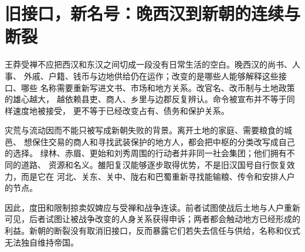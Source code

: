 \section{旧接口，新名号：晚西汉到新朝的连续与断裂}
\label{sec:han-late-western-continuity-breaks}

王莽受禅不应把西汉和东汉之间切成一段没有日常生活的空白。晚西汉的尚书、人事、
外戚、户籍、钱币与边地供给仍在运作；改变的是哪些人能够解释这些接口、哪些
名称需要重新写进文书、市场和地方关系。改官名、改币制与土地政策的雄心越大，
越依赖县吏、商人、乡里与边郡反复辨认。命令被宣布并不等于同样速度地被接受，
更不等于已经改变占有、债务和保护关系。

灾荒与流动因而不能只被写成新朝失败的背景。离开土地的家庭、需要粮食的城邑、
想保住交易的商人和寻找武装保护的地方人，都会把中枢的分类改写成自己的选择。
绿林、赤眉、更始和刘秀周围的行动者并非同一社会集团；他们拥有不同的道路、
资源和名义。雒阳复汉能够逐步取得优势，不是旧汉国号自行恢复效力，而是它在
河北、关东、关中、陇右和巴蜀重新寻找能输粮、传令和安排人户的节点。

因此，度田和限制掠卖奴婢应与受禅和战争连读。前者试图使战后土地与人户重新
可见，后者试图让被战争改变的人身关系获得申诉；两者都会触动地方已经形成的
利益。新朝的断裂没有取消旧接口，反而暴露它们若失去信任与供给，名称和仪式
无法独自维持帝国。
